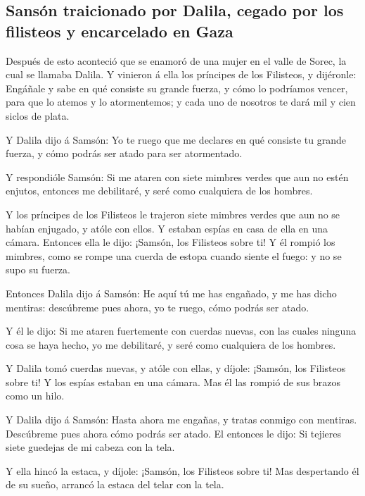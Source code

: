 \hypertarget{sansuxf3n-traicionado-por-dalila-cegado-por-los-filisteos-y-encarcelado-en-gaza}{%
\subsection{Sansón traicionado por Dalila, cegado por los filisteos y
encarcelado en
Gaza}\label{sansuxf3n-traicionado-por-dalila-cegado-por-los-filisteos-y-encarcelado-en-gaza}}

 Después de esto aconteció que se enamoró de una mujer en el
valle de Sorec, la cual se llamaba Dalila.  Y vinieron á
ella los príncipes de los Filisteos, y dijéronle: Engáñale y sabe en qué
consiste su grande fuerza, y cómo lo podríamos vencer, para que lo
atemos y lo atormentemos; y cada uno de nosotros te dará mil y cien
siclos de plata.

 Y Dalila dijo á Samsón: Yo te ruego que me declares en qué
consiste tu grande fuerza, y cómo podrás ser atado para ser atormentado.

 Y respondióle Samsón: Si me ataren con siete mimbres verdes
que aun no estén enjutos, entonces me debilitaré, y seré como cualquiera
de los hombres.

 Y los príncipes de los Filisteos le trajeron siete mimbres
verdes que aun no se habían enjugado, y atóle con ellos.  Y
estaban espías en casa de ella en una cámara. Entonces ella le dijo:
¡Samsón, los Filisteos sobre ti! Y él rompió los mimbres, como se rompe
una cuerda de estopa cuando siente el fuego: y no se supo su fuerza.

 Entonces Dalila dijo á Samsón: He aquí tú me has engañado,
y me has dicho mentiras: descúbreme pues ahora, yo te ruego, cómo podrás
ser atado.

 Y él le dijo: Si me ataren fuertemente con cuerdas nuevas,
con las cuales ninguna cosa se haya hecho, yo me debilitaré, y seré como
cualquiera de los hombres.

 Y Dalila tomó cuerdas nuevas, y atóle con ellas, y díjole:
¡Samsón, los Filisteos sobre ti! Y los espías estaban en una cámara. Mas
él las rompió de sus brazos como un hilo.

 Y Dalila dijo á Samsón: Hasta ahora me engañas, y tratas
conmigo con mentiras. Descúbreme pues ahora cómo podrás ser atado. El
entonces le dijo: Si tejieres siete guedejas de mi cabeza con la tela.

 Y ella hincó la estaca, y díjole: ¡Samsón, los Filisteos
sobre ti! Mas despertando él de su sueño, arrancó la estaca del telar
con la tela.

